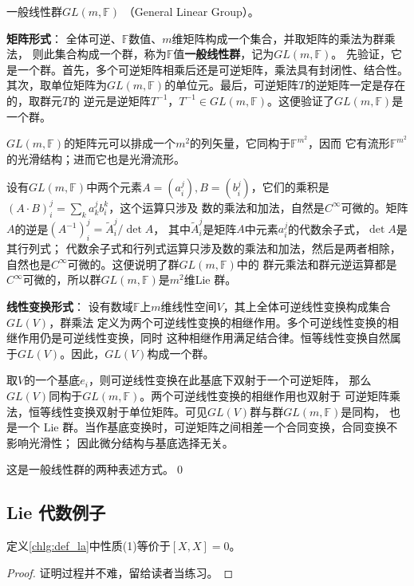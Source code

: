 \begin{example}\label{chlg:exm_GL}
    一般线性群$GL(m,\mathbb{F})$ （General Linear Group）。
\end{example}
\textbf{矩阵形式}：
全体可逆、$\mathbb{F}$数值、$m$维矩阵构成一个集合，并取矩阵的乘法为群乘法，
则此集合构成一个群，称为$\mathbb{F}$值\textbf{一般线性群}，记为$GL(m,\mathbb{F})$。
先验证，它是一个群。首先，多个可逆矩阵相乘后还是可逆矩阵，乘法具有封闭性、结合性。
其次，取单位矩阵为$GL(m,\mathbb{F})$的单位元。最后，可逆矩阵$T$的逆矩阵一定是存在的，取群元$T$的
逆元是逆矩阵$T^{-1}$，$T^{-1}\in GL(m,\mathbb{F})$。这便验证了$GL(m,\mathbb{F})$是一个群。

$GL(m,\mathbb{F})$的矩阵元可以排成一个$m^2$的列矢量，它同构于$\mathbb{F}^{m^2}$，因而
它有流形$\mathbb{F}^{m^2}$的光滑结构；进而它也是光滑流形。

设有$GL(m,\mathbb{F})$中两个元素$A=(a^j_{i}), B=(b^j_{i})$，它们的乘积是
$(A\cdot B)^{j}_{i} = \sum_{k} a^j_{k} b^k_{i}$，这个运算只涉及
数的乘法和加法，自然是$C^\infty$可微的。矩阵$A$的逆是$(A^{-1})^{j}_{i}=\tilde{A}^{j}_{i}/{\det A}$，
其中$\tilde{A}^{j}_{i}$是矩阵$A$中元素$a^{j}_{i}$的代数余子式，$\det A$是其行列式；
代数余子式和行列式运算只涉及数的乘法和加法，然后是两者相除，
自然也是$C^\infty$可微的。这便说明了群$GL(m,\mathbb{F})$中的
群元乘法和群元逆运算都是$C^\infty$可微的，所以群$GL(m,\mathbb{F})$是$m^2$维{Lie 群}。

\textbf{线性变换形式}：
设有数域$\mathbb{F}$上$m$维线性空间$V$，其上全体可逆线性变换构成集合$GL(V)$，群乘法
定义为两个可逆线性变换的相继作用。多个可逆线性变换的相继作用仍是可逆线性变换，同时
这种相继作用满足结合律。恒等线性变换自然属于$GL(V)$。因此，$GL(V)$构成一个群。

取$V$的一个基底$e_i$，则可逆线性变换在此基底下双射于一个可逆矩阵，
那么$GL(V)$同构于$GL(m,\mathbb{F})$。两个可逆线性变换的相继作用也双射于
可逆矩阵乘法，恒等线性变换双射于单位矩阵。可见$GL(V)$群与群$GL(m,\mathbb{F})$是同构，
也是一个 Lie 群。当作基底变换时，可逆矩阵之间相差一个合同变换，合同变换不影响光滑性；
因此微分结构与基底选择无关。

这是一般线性群的两种表述方式。\qed

\subsection{Lie 代数例子}

\begin{proposition}
    定义\ref{chlg:def_la}中性质(1)等价于$[X,X]=0$。
\end{proposition}
\begin{proof}
	证明过程并不难，留给读者当练习。
\end{proof}

